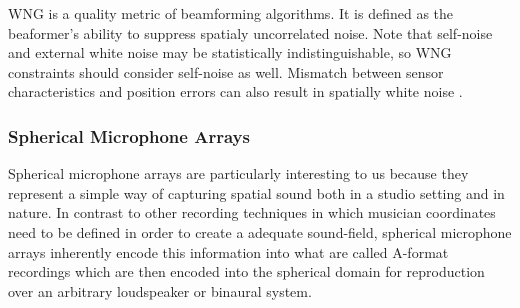 
WNG is a quality metric of beamforming algorithms. It is defined as the beaformer's ability to suppress spatialy uncorrelated noise. Note that self-noise and external white noise may be statistically indistinguishable, so WNG constraints should consider self-noise as well. Mismatch between sensor characteristics and position errors can also result in spatially white noise \cite{mabande2009design}.  




\subsubsection{Spherical Microphone Arrays}

Spherical microphone arrays are particularly interesting to us because they represent a simple way of capturing spatial sound both in a studio setting and in nature. In contrast to other recording techniques in which musician coordinates need to be defined in order to create a adequate sound-field, spherical microphone arrays inherently encode this information into what are called A-format recordings which are then encoded into the spherical domain for reproduction over an arbitrary loudspeaker or binaural system. 


